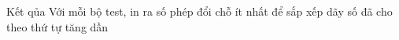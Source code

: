 Kết qủa
Với mỗi bộ test, in ra số phép đổi chỗ ít nhất để sắp xếp dãy số đã cho theo thứ tự tăng dần
